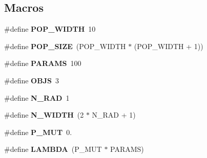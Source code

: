 \subsection*{Macros}
\begin{DoxyCompactItemize}
\item 
\#define {\bfseries P\+O\+P\+\_\+\+W\+I\+D\+TH}~10\hypertarget{mcea_8cu_a078505a45e5598fe76de40d43e70e48a}{}\label{mcea_8cu_a078505a45e5598fe76de40d43e70e48a}

\item 
\#define {\bfseries P\+O\+P\+\_\+\+S\+I\+ZE}~(P\+O\+P\+\_\+\+W\+I\+D\+TH $\ast$ (P\+O\+P\+\_\+\+W\+I\+D\+TH + 1))\hypertarget{mcea_8cu_aea5b3e4c9df97408e95b67cdf3f992fb}{}\label{mcea_8cu_aea5b3e4c9df97408e95b67cdf3f992fb}

\item 
\#define {\bfseries P\+A\+R\+A\+MS}~100\hypertarget{mcea_8cu_ab0b1e59d96396ba9dca2147f9feb44eb}{}\label{mcea_8cu_ab0b1e59d96396ba9dca2147f9feb44eb}

\item 
\#define {\bfseries O\+B\+JS}~3\hypertarget{mcea_8cu_ad15e0f6530352f2b65cb6147c597c61b}{}\label{mcea_8cu_ad15e0f6530352f2b65cb6147c597c61b}

\item 
\#define {\bfseries N\+\_\+\+R\+AD}~1\hypertarget{mcea_8cu_a1b387c96005508188bcbe44b4c431b84}{}\label{mcea_8cu_a1b387c96005508188bcbe44b4c431b84}

\item 
\#define {\bfseries N\+\_\+\+W\+I\+D\+TH}~(2 $\ast$ N\+\_\+\+R\+AD + 1)\hypertarget{mcea_8cu_a319e72f5bf1ed96ebb2d7d034be66cbe}{}\label{mcea_8cu_a319e72f5bf1ed96ebb2d7d034be66cbe}

\item 
\#define {\bfseries P\+\_\+\+M\+UT}~0.\hypertarget{mcea_8cu_a9388d332cfa4e6dc24e4fd7c33a35f17}{}\label{mcea_8cu_a9388d332cfa4e6dc24e4fd7c33a35f17}

\item 
\#define {\bfseries L\+A\+M\+B\+DA}~(P\+\_\+\+M\+UT $\ast$ P\+A\+R\+A\+MS)\hypertarget{mcea_8cu_a738607799d6938e1b15f463688029cd5}{}\label{mcea_8cu_a738607799d6938e1b15f463688029cd5}

\end{DoxyCompactItemize}
